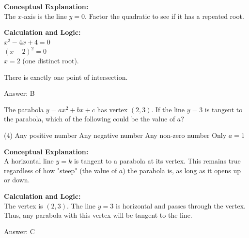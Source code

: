 \documentclass[11pt,paper=a4,answers]{exam}
\begin{document}
\begin{questions}
\begin{solution}
\textbf{Conceptual Explanation:} \\
The $x$-axis is the line $y = 0$. Factor the quadratic to see if it has a repeated root.

\vspace{20pt}

\textbf{Calculation and Logic:} \\
$x^2 - 4x + 4 = 0$ \\
$(x - 2)^2 = 0$ \\
$x = 2$ (one distinct root).

\vspace{10pt}

There is exactly one point of intersection.

\vspace{25pt}

Answer: \colorbox{yellow!100}{B}
\end{solution}

\vspace{40pt}

\question
The parabola $y = ax^2 + bx + c$ has vertex $(2, 3)$. If the line $y = 3$ is tangent to the parabola, which of the following could be the value of $a$?
\begin{tasks}(4)
    \task Any positive number
    \task Any negative number
    \task Any non-zero number
    \task Only $a = 1$
\end{tasks}

\begin{solution}
\textbf{Conceptual Explanation:} \\
A horizontal line $y = k$ is tangent to a parabola at its vertex. This remains true regardless of how "steep" (the value of $a$) the parabola is, as long as it opens up or down.

\vspace{20pt}

\textbf{Calculation and Logic:} \\
The vertex is $(2, 3)$. The line $y = 3$ is horizontal and passes through the vertex. Thus, any parabola with this vertex will be tangent to the line.

\vspace{25pt}

Answer: \colorbox{yellow!100}{C}
\end{solution}

\vspace{40pt}


\end{questions}
\end{document}
